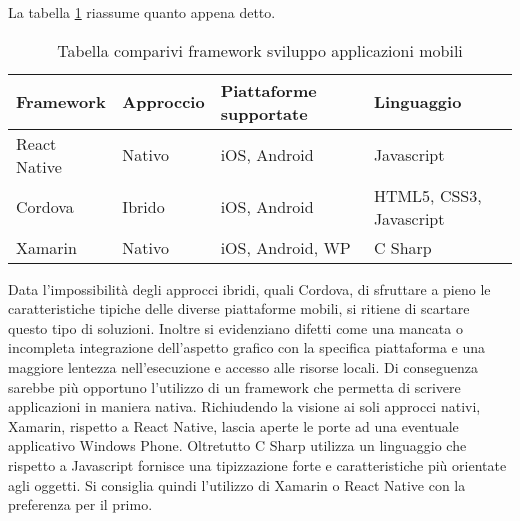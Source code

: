  La tabella \ref{tab:comp-framework} riassume quanto appena detto.
\begin{table}[!h] %
    \caption{Tabella comparivi framework sviluppo applicazioni mobili}
    \label{tab:comp-framework}
    \begin{tabularx}{\textwidth}{llll}
    \hline
    \textbf{Framework} & \textbf{Approccio} & \textbf{Piattaforme supportate} &\textbf{Linguaggio}\\
    \hline
    React Native   & Nativo & iOS, Android & Javascript\\
    \hline
    Cordova   & Ibrido & iOS, Android & HTML5, CSS3, Javascript\\
    \hline
    Xamarin   & Nativo & iOS, Android, WP & C Sharp\\
    \hline
    \end{tabularx}
    \end{table}%
Data l’impossibilità degli approcci ibridi, quali Cordova, di sfruttare a pieno le caratteristiche tipiche delle diverse piattaforme mobili, si ritiene di scartare questo tipo di soluzioni.
Inoltre si evidenziano difetti come una mancata o incompleta integrazione dell’aspetto grafico con la specifica piattaforma e una maggiore lentezza nell’esecuzione e accesso alle risorse locali.
Di conseguenza sarebbe più opportuno l’utilizzo di un framework che permetta di scrivere applicazioni in maniera nativa. 
Richiudendo la visione ai soli approcci nativi, Xamarin, rispetto a React Native, lascia aperte le porte ad una eventuale applicativo Windows Phone. Oltretutto C Sharp utilizza un linguaggio che rispetto a Javascript fornisce una tipizzazione forte e caratteristiche più orientate agli oggetti. Si consiglia quindi l’utilizzo di Xamarin o React Native con la preferenza per il primo.
